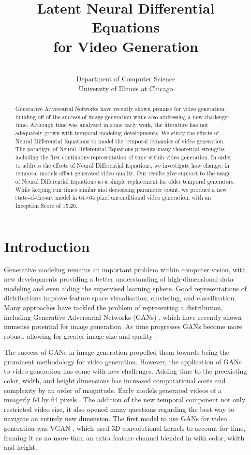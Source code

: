\documentclass[tablecaption=bottom,pmlr]{jmlr}
\title{Latent Neural Differential Equations\;\\ for Video Generation}
\author{\Name{Cade Gordon} \Email{cadegordonml@gmail.com}\and
   \Name{Natalie Parde} \Email{parde@uic.edu}\\
   \addr Department of Computer Science \\ University of Illinois at Chicago}
\begin{document}
\maketitle

\begin{abstract}
  Generative Adversarial Networks have recently shown promise for video generation, building off of the success of image generation while also addressing a new challenge: time. Although time was analyzed in some early work, the literature has not adequately grown with temporal modeling developments. We study the effects of Neural Differential Equations to model the temporal dynamics of video generation. The paradigm of Neural Differential Equations presents many theoretical strengths including the first continuous representation of time within video generation. In order to address the effects of Neural Differential Equations, we investigate how changes in temporal models affect generated video quality. Our results give support to the usage of Neural Differential Equations as a simple replacement for older temporal generators. While keeping run times similar and decreasing parameter count, we produce a new state-of-the-art model in 64$\times$64 pixel unconditional video generation, with an Inception Score of 15.20.
\end{abstract}

\section{Introduction}

Generative modeling remains an important problem within computer vision, with new developments providing a better understanding of high-dimensional data modeling and even aiding the supervised learning sphere. Good representations of distributions improve
feature space visualisation, clustering, and classification.  Many approaches have tackled the problem of representing a distribution, including Generative Adversarial Networks (GANs) \citep{gans}, which have recently shown immense potential for image generation. As time progresses GANs become more robust, allowing for greater image size \citep{dcgan,proggan,biggan} and quality \citep{stylegan1,stylegan2}.

The success of GANs in image generation propelled them towards being the prominent methodology for video generation. However, the application of GANs to video generation has come with new challenges. Adding time to the preexisting color, width, and height dimensions has increased computational costs and complexity by an order of magnitude. Early models generated videos of a meagerly 64 by 64 pixels \citep{vgan,tgan,mocogan}. The addition of the new temporal component not only restricted video size, it also opened many questions regarding the best way to navigate an entirely new dimension. The first model to use GANs for video generation was VGAN \citep{vgan}, which used 3D convolutional kernels to account for time, framing it as no more than an extra feature channel blended in with color, width and height.
\end{document}
